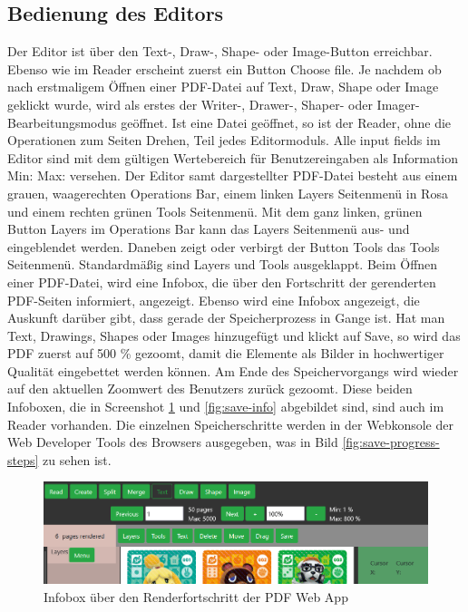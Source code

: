\subsection{Bedienung des Editors}
Der Editor ist über den Text-, Draw-, Shape- oder Image-Button erreichbar. Ebenso wie im Reader erscheint zuerst ein Button Choose file. Je nachdem ob nach erstmaligem Öffnen einer PDF-Datei auf Text, Draw, Shape oder Image geklickt wurde, wird als erstes der Writer-, Drawer-, Shaper- oder Imager-Bearbeitungsmodus geöffnet. Ist eine Datei geöffnet, so ist der Reader, ohne die Operationen zum Seiten Drehen, Teil jedes Editormoduls. Alle input fields im Editor sind mit dem gültigen Wertebereich für Benutzereingaben als Information Min: Max: versehen. Der Editor samt dargestellter PDF-Datei besteht aus einem grauen, waagerechten Operations Bar, einem linken Layers Seitenmenü in Rosa und einem rechten grünen Tools Seitenmenü. Mit dem ganz linken, grünen Button Layers im Operations Bar kann das Layers Seitenmenü aus- und eingeblendet werden. Daneben zeigt oder verbirgt der Button Tools das Tools Seitenmenü. Standardmäßig sind Layers und Tools ausgeklappt. Beim Öffnen einer PDF-Datei, wird eine Infobox, die über den Fortschritt der gerenderten PDF-Seiten informiert, angezeigt. Ebenso wird eine Infobox angezeigt, die Auskunft darüber gibt, dass gerade der Speicherprozess in Gange ist. Hat man Text, Drawings, Shapes oder Images hinzugefügt und klickt auf Save, so wird das PDF zuerst auf 500 \% gezoomt, damit die Elemente als Bilder in hochwertiger Qualität eingebettet werden können. Am Ende des Speichervorgangs wird wieder auf den aktuellen Zoomwert des Benutzers zurück gezoomt. Diese beiden Infoboxen, die in Screenshot \ref{fig:render-info} und \ref{fig:save-info} abgebildet sind, sind auch im Reader vorhanden. Die einzelnen Speicherschritte werden in der Webkonsole der Web Developer Tools des Browsers ausgegeben, was in Bild \ref{fig:save-progress-steps} zu sehen ist.

\begin{figure}[!htbp]
	\centering
	\includegraphics[width=1\textwidth]{"images/render-info.png"}
	\caption{Infobox über den Renderfortschritt der PDF Web App}
	\label{fig:render-info}
\end{figure}

